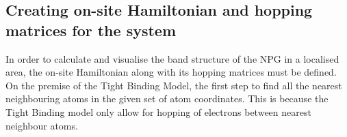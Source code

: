 \subsection{Creating on-site Hamiltonian and hopping matrices for the system}
In order to calculate and visualise the band structure of the NPG in a localised area, the on-site Hamiltonian along with its hopping matrices must be defined. On the premise of the Tight Binding Model, the first step to find all the nearest neighbouring atoms in the given set of atom coordinates. This is because the Tight Binding model only allow for hopping of electrons between nearest neighbour atoms.  
